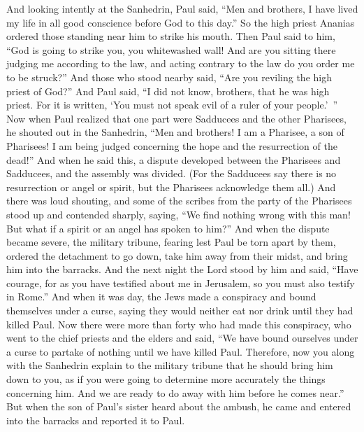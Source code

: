 \begin{biblechapter} %
 And looking intently at the Sanhedrin, Paul said, “Men and brothers, I have lived my life in all good conscience before God to this day.”
\verse So the high priest Ananias ordered those standing near him to strike his mouth.
\verse Then Paul said to him, “God is going to strike you, you whitewashed wall! And are you sitting there judging me according to the law, and acting contrary to the law do you order me to be struck?”
\verse And those who stood nearby said, “Are you reviling the high priest of God?”
\verse And Paul said, “I did not know, brothers, that he was high priest. For it is written, ‘You must not speak evil of a ruler of your people.’ ”
\verse Now when Paul realized that one part were Sadducees and the other Pharisees, he shouted out in the Sanhedrin, “Men and brothers! I am a Pharisee, a son of Pharisees! I am being judged concerning the hope and the resurrection of the dead!”
\verse And when he said this, a dispute developed between the Pharisees and Sadducees, and the assembly was divided.
\verse (For the Sadducees say there is no resurrection or angel or spirit, but the Pharisees acknowledge them all.)
\verse And there was loud shouting, and some of the scribes from the party of the Pharisees stood up and contended sharply, saying, “We find nothing wrong with this man! But what if a spirit or an angel has spoken to him?”
\verse And when the dispute became severe, the military tribune, fearing lest Paul be torn apart by them, ordered the detachment to go down, take him away from their midst, and bring him into the barracks.
\verse And the next night the Lord stood by him and said, “Have courage, for as you have testified about me in Jerusalem, so you must also testify in Rome.”
 And when it was day, the Jews made a conspiracy and bound themselves under a curse, saying they would neither eat nor drink until they had killed Paul.
\verse Now there were more than forty who had made this conspiracy,
\verse who went to the chief priests and the elders and said, “We have bound ourselves under a curse to partake of nothing until we have killed Paul.
\verse Therefore, now you along with the Sanhedrin explain to the military tribune that he should bring him down to you, as if you were going to determine more accurately the things concerning him. And we are ready to do away with him before he comes near.”
\verse But when the son of Paul’s sister heard about the ambush, he came and entered into the barracks and reported it to Paul.

\end{biblechapter}
